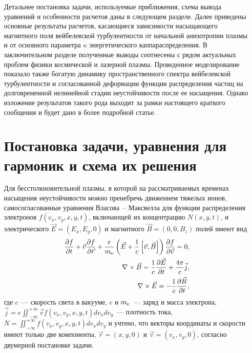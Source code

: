 Детальнее постановка задачи, используемые приближения, схема вывода уравнений и особенности расчетов даны в следующем разделе. Далее приведены основные результаты расчетов, касающиеся зависимости насыщающего магнитного поля вейбелевской турбулентности от начальной анизотропии плазмы и от основного параметра $\kappa$ энергетического каппа{\PunctumKappa}распределения. В заключительном разделе полученные выводы соотнесены с рядом актуальных проблем физики космической и лазерной плазмы. Проведенное моделирование показало также богатую динамику пространственного спектра вейбелевской турбулентности и согласованной деформации функции распределения частиц на долговременной нелинейной стадии неустойчивости после ее насыщения. Однако изложение результатов такого рода выходит за рамки настоящего краткого сообщения и будет дано в более подробной статье. 

\section{Постановка задачи, уравнения для гармоник и схема их решения}

Для бесстолкновительной плазмы, в которой на рассматриваемых временах насыщения неустойчивости можно пренебречь движением тяжелых ионов, самосогласованные уравнения Власова~-- Максвелла для функции распределения электронов $f(v_x , v_y , x, y, t)$, включающей их концентрацию $N (x, y, t)$, и электрического $\vec{E}=(E_x, E_y, 0)$ и магнитного $\vec{B}=(0, 0, B_z)$ полей имеют вид
\begin{eqnarray}
    \dfrac{\partial f}{\partial t}+\vec{v}\dfrac{\partial f}{\partial \vec{r}}+\dfrac{e}{m_\mathrm{e}} \left(\vec{E}+\dfrac{1}{c}\left[\vec{v},\vec{B}\right]\right) \dfrac{\partial f}{\partial \vec{v}}=0, \\
    \label{eq:maxw1} 
    \nabla \times \vec{B}=\dfrac{1}{c}\dfrac{\partial \vec{E}}{\partial t}+\dfrac{4\pi}{c}\vec{j}, \\
    \label{eq:maxw2}
    \nabla \times \vec{E}=-\dfrac{1}{c}\dfrac{\partial \vec{B}}{\partial t},
\end{eqnarray}
где $c$~--- скорость света в вакууме, $e$ и $m_\mathrm{e}$~--- заряд и масса электрона, $\vec{j}=e\iint^{+\infty}_{-\infty}\vec{v}f(v_x , v_y , x, y, t) dv_x dv_y$~--- плотность тока, $N=\iint^{+\infty}_{-\infty}f(v_x , v_y , x, y, t)dv_xdv_y$ и учтено, что векторы координаты и скорости имеют только две компоненты, $\vec{r}=(x , y ,0)$ и $\vec{v}=(v_x , v_y ,0)$, согласно двумерной постановке задачи. 

